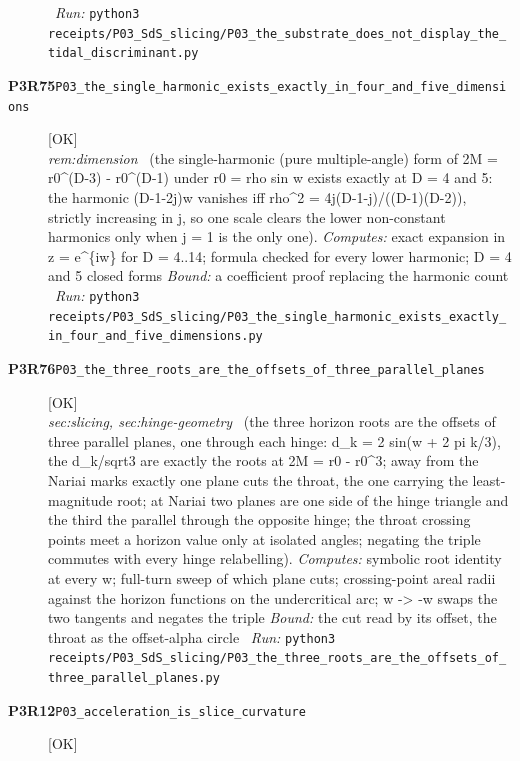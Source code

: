 \begin{description}
\ \emph{Run:} \texttt{python3 receipts/P03\_SdS\_slicing/P03\_the\_substrate\_does\_not\_display\_the\_tidal\_discriminant.py}
\item[\rcptlabel{P03_the_single_harmonic_exists_exactly_in_four_and_five_dimensions}{P3R75}\textbf{P3R75}\quad\texttt{P03\_the\_single\_harmonic\_exists\_exactly\_in\_four\_and\_five\_dimensions}]\hfill\textsf{[OK]}\\
\textit{rem:dimension} \ (the single-harmonic (pure multiple-angle) form of 2M = r0\textasciicircum{}(D-3) - r0\textasciicircum{}(D-1) under r0 = rho sin w exists exactly at D = 4 and 5: the harmonic (D-1-2j)w vanishes iff rho\textasciicircum{}2 = 4j(D-1-j)/((D-1)(D-2)), strictly increasing in j, so one scale clears the lower non-constant harmonics only when j = 1 is the only one). 
\emph{Computes:} exact expansion in z = e\textasciicircum{}\{iw\} for D = 4..14; formula checked for every lower harmonic; D = 4 and 5 closed forms
 \emph{Bound:} a coefficient proof replacing the harmonic count
\ \emph{Run:} \texttt{python3 receipts/P03\_SdS\_slicing/P03\_the\_single\_harmonic\_exists\_exactly\_in\_four\_and\_five\_dimensions.py}
\item[\rcptlabel{P03_the_three_roots_are_the_offsets_of_three_parallel_planes}{P3R76}\textbf{P3R76}\quad\texttt{P03\_the\_three\_roots\_are\_the\_offsets\_of\_three\_parallel\_planes}]\hfill\textsf{[OK]}\\
\textit{sec:slicing, sec:hinge-geometry} \ (the three horizon roots are the offsets of three parallel planes, one through each hinge: d\_k = 2 sin(w + 2 pi k/3), the d\_k/sqrt3 are exactly the roots at 2M = r0 - r0\textasciicircum{}3; away from the Nariai marks exactly one plane cuts the throat, the one carrying the least-magnitude root; at Nariai two planes are one side of the hinge triangle and the third the parallel through the opposite hinge; the throat crossing points meet a horizon value only at isolated angles; negating the triple commutes with every hinge relabelling). 
\emph{Computes:} symbolic root identity at every w; full-turn sweep of which plane cuts; crossing-point areal radii against the horizon functions on the undercritical arc; w -> -w swaps the two tangents and negates the triple
 \emph{Bound:} the cut read by its offset, the throat as the offset-alpha circle
\ \emph{Run:} \texttt{python3 receipts/P03\_SdS\_slicing/P03\_the\_three\_roots\_are\_the\_offsets\_of\_three\_parallel\_planes.py}
\item[\rcptlabel{P03_acceleration_is_slice_curvature}{P3R12}\textbf{P3R12}\quad\texttt{P03\_acceleration\_is\_slice\_curvature}]\hfill\textsf{[OK]}\\

\end{description}
